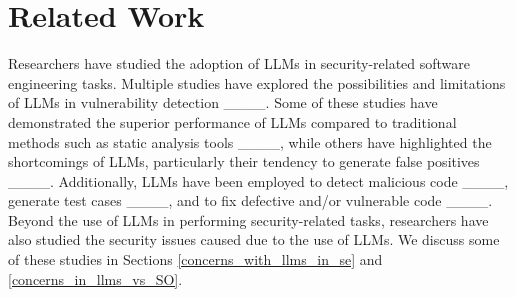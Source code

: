 \section{Related Work}


Researchers have studied the adoption of LLMs in security-related software engineering tasks. Multiple studies have explored the possibilities and limitations of LLMs in vulnerability detection ____. Some of these studies have demonstrated the superior performance of LLMs compared to traditional methods such as static analysis tools ____, while others have highlighted the shortcomings of LLMs, particularly their tendency to generate false positives ____. Additionally, LLMs have been employed to detect malicious code ____, generate test cases ____, and to fix defective and/or vulnerable code ____. Beyond the use of LLMs in performing security-related tasks, researchers have also studied the security issues caused due to the use of LLMs. We discuss some of these studies in Sections \ref{concerns_with_llms_in_se} and \ref{concerns_in_llms_vs_SO}.

